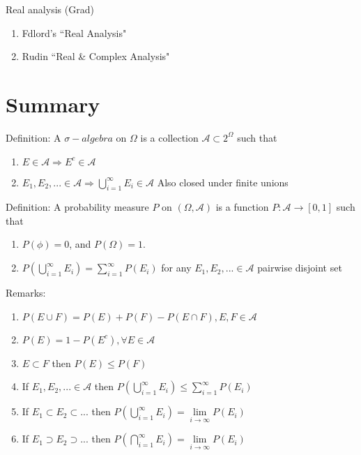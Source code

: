 \documentclass[12pt]{article}
\newcommand{\A}{\mathcal{A}}
\begin{document}
Real analysis (Grad)

\begin{enumerate}
    \item Fdlord's ``Real Analysis"
    \item Rudin ``Real \& Complex Analysis"
\end{enumerate}

\section{Summary}

Definition: A $\sigma-algebra$ on $\Omega$ is a collection $\A\subset 2^\Omega$ such that
\begin{enumerate}
    \item $E\in\A \Rightarrow E^c\in\A$
    \item $E_1,E_2,...\in\A\Rightarrow \bigcup\limits_{i=1}^{\infty} E_i\in\A$ Also closed under finite unions
\end{enumerate}

Definition: A probability measure $P$ on $(\Omega,\A)$ is a function $P:\A\rightarrow [0,1]$
such that
\begin{enumerate}
    \item $P(\phi)=0$, and $P(\Omega)=1$.
    \item $P(\bigcup\limits_{i=1}^{\infty} E_i)=\sum\limits_{i=1}^{\infty} P(E_i)$
        for any $E_1,E_2,...\in\A$ pairwise disjoint set
\end{enumerate}

Remarks:
\begin{enumerate}
    \item $P(E\cup F)=P(E)+P(F)-P(E\cap F), E,F\in\A$
    \item $P(E)=1-P(E^c), \forall E\in \A$
    \item $E\subset F$ then $P(E)\le P(F)$
    \item If $E_1,E_2,...\in\A$ then $P(\bigcup\limits_{i=1}^{\infty} E_i)\le
        \sum\limits_{i=1}^{\infty} P(E_i)$

    \item If $E_1\subset E_2\subset... $ then $P(\bigcup\limits_{i=1}^{\infty} E_i)
        =\lim\limits_{i\rightarrow \infty} P(E_i)$

    \item If $E_1\supset E_2\supset...$ then $P(\bigcap\limits_{i=1}^{\infty} E_i)
        =\lim\limits_{i\rightarrow \infty} P(E_i)$

\end{enumerate}
\end{document}
